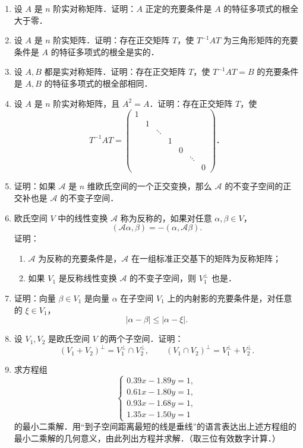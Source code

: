 \begin{enumerate}
  \item 设 $A$ 是 $n$ 阶实对称矩阵．证明：$A$ 正定的充要条件是 $A$ 的特征多项式的根全大于零．

  \ansproof
  \item 设 $A$ 是 $n$ 阶实矩阵．证明：存在正交矩阵 $T$，使 $T^{-1}AT$ 为三角形矩阵的充要条件是 $A$ 的特征多项式的根全是实的．

  \ansproof
  \item 设 $A,B$ 都是实对称矩阵．证明：存在正交矩阵 $T$，使 $T^{-1}AT=B$ 的充要条件是 $A,B$ 的特征多项式的根全部相同．

  \ansproof
  \item 设 $A$ 是 $n$ 阶实对称矩阵，且 $A^2=A$．证明：存在正交矩阵 $T$，使
  \[
  T^{-1}AT=\begin{pmatrix}
    1 & & & & & & \\
    & 1 & & & & & \\
    & & \ddots & & & & \\
    & & & 1 & & & \\
    & & & & 0 & & \\
    & & & & & \ddots & \\
    & & & & & & 0
  \end{pmatrix}\text{．}
  \]

  \ansproof
  \item 证明：如果 $\mathcal{A}$ 是 $n$ 维欧氏空间的一个正交变换，那么 $\mathcal{A}$ 的不变子空间的正交补也是 $\mathcal{A}$ 的不变子空间．

  \ansproof
  \item 欧氏空间 $V$ 中的线性变换 $\mathcal{A}$ 称为反称的，如果对任意 $\alpha,\beta\in V$，
  \[
  (\mathcal{A}\alpha,\beta)=-(\alpha,\mathcal{A}\beta).
  \]
  证明：
  \begin{enumerate}
    \item $\mathcal{A}$ 为反称的充要条件是，$\mathcal{A}$ 在一组标准正交基下的矩阵为反称矩阵；
  \anssub
    \item 如果 $V_1$ 是反称线性变换 $\mathcal{A}$ 的不变子空间，则 $V_1^{\perp}$ 也是．
  \anssub
  \end{enumerate}

  \item 证明：向量 $\beta\in V_1$ 是向量 $\alpha$ 在子空间 $V_1$ 上的内射影的充要条件是，对任意的 $\xi\in V_1$，
  \[
  |\alpha-\beta|\le|\alpha-\xi|.
  \]

  \ansproof
  \item 设 $V_1,V_2$ 是欧氏空间 $V$ 的两个子空间．证明：
  \[
  (V_1+V_2)^{\perp}=V_1^{\perp}\cap V_2^{\perp},\qquad
  (V_1\cap V_2)^{\perp}=V_1^{\perp}+V_2^{\perp}.
  \]

  \ansproof
  \item 求方程组
  \[
  \begin{cases}
    0.39x-1.89y=1,\\
    0.61x-1.80y=1,\\
    0.93x-1.68y=1,\\
    1.35x-1.50y=1
  \end{cases}
  \]
  的最小二乘解．用“到子空间距离最短的线是垂线”的语言表达出上述方程组的最小二乘解的几何意义，由此列出方程并求解．（取三位有效数字计算．）
  \anscompute
\end{enumerate}

